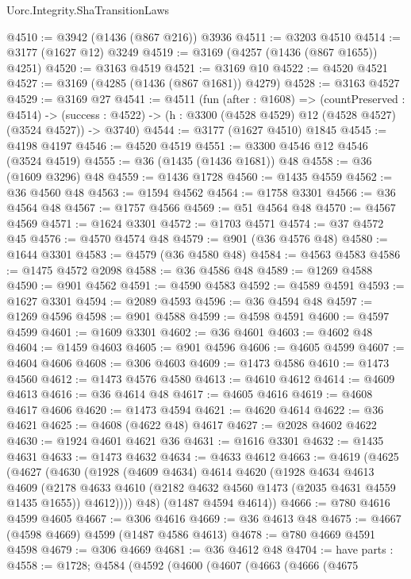 \begin{lexlean}{Uorc.Integrity.ShaTransitionLaws}
\begin{coremodule}
@4510 := @3942 (@1436 (@867 @216)) @3936
@4511 := @3203 @4510
@4514 := @3177 (@1627 @12) @3249
@4519 := @3169 (@4257 (@1436 (@867 @1655)) @4251)
@4520 := @3163 @4519
@4521 := @3169 @10
@4522 := @4520 @4521
@4527 := @3169 (@4285 (@1436 (@867 @1681)) @4279)
@4528 := @3163 @4527
@4529 := @3169 @27
@4541 := @4511
    (fun (after : @1608) =>
    (countPreserved : @4514) ->
    (success : @4522) -> (h : @3300 (@4528 @4529) @12 (@4528 @4527) (@3524 @4527)) -> @3740)
@4544 := @3177 (@1627 @4510) @1845
@4545 := @4198 @4197
@4546 := @4520 @4519
@4551 := @3300 @4546 @12 @4546 (@3524 @4519)
@4555 := @36 (@1435 (@1436 @1681)) @48
@4558 := @36 (@1609 @3296) @48
@4559 := @1436 @1728
@4560 := @1435 @4559
@4562 := @36 @4560 @48
@4563 := @1594 @4562
@4564 := @1758 @3301
@4566 := @36 @4564 @48
@4567 := @1757 @4566
@4569 := @51 @4564 @48
@4570 := @4567 @4569
@4571 := @1624 @3301
@4572 := @1703 @4571
@4574 := @37 @4572 @45
@4576 := @4570 @4574 @48
@4579 := @901 (@36 @4576 @48)
@4580 := @1644 @3301
@4583 := @4579 (@36 @4580 @48)
@4584 := @4563 @4583
@4586 := @1475 @4572 @2098
@4588 := @36 @4586 @48
@4589 := @1269 @4588
@4590 := @901 @4562
@4591 := @4590 @4583
@4592 := @4589 @4591
@4593 := @1627 @3301
@4594 := @2089 @4593
@4596 := @36 @4594 @48
@4597 := @1269 @4596
@4598 := @901 @4588
@4599 := @4598 @4591
@4600 := @4597 @4599
@4601 := @1609 @3301
@4602 := @36 @4601
@4603 := @4602 @48
@4604 := @1459 @4603
@4605 := @901 @4596
@4606 := @4605 @4599
@4607 := @4604 @4606
@4608 := @306 @4603
@4609 := @1473 @4586
@4610 := @1473 @4560
@4612 := @1473 @4576 @4580
@4613 := @4610 @4612
@4614 := @4609 @4613
@4616 := @36 @4614 @48
@4617 := @4605 @4616
@4619 := @4608 @4617 @4606
@4620 := @1473 @4594
@4621 := @4620 @4614
@4622 := @36 @4621
@4625 := @4608 (@4622 @48) @4617
@4627 := @2028 @4602 @4622
@4630 := @1924 @4601 @4621 @36
@4631 := @1616 @3301
@4632 := @1435 @4631
@4633 := @1473 @4632
@4634 := @4633 @4612
@4663 := @4619
    (@4625
      (@4627
        (@4630
          (@1928
            (@4609 @4634)
            @4614
            @4620
            (@1928
              @4634
              @4613
              @4609
              (@2178 @4633 @4610 (@2182 @4632 @4560 @1473 (@2035 @4631 @4559 @1435 @1655)) @4612))))
        @48)
      (@1487 @4594 @4614))
@4666 := @780 @4616 @4599 @4605
@4667 := @306 @4616
@4669 := @36 @4613 @48
@4675 := @4667 (@4598 @4669) @4599 (@1487 @4586 @4613)
@4678 := @780 @4669 @4591 @4598
@4679 := @306 @4669
@4681 := @36 @4612 @48
@4704 := have parts : @4558 := @1728;
  @4584
    (@4592
      (@4600
        (@4607
          (@4663
            (@4666
              (@4675

\end{coremodule}
\end{lexlean}
